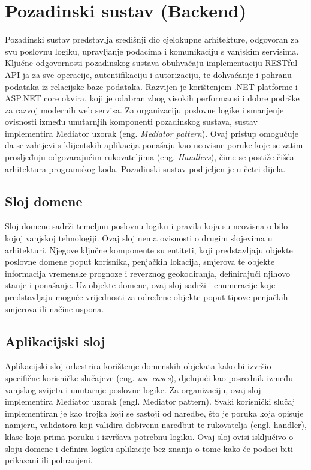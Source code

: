 \section{Pozadinski sustav (Backend)}

Pozadinski sustav predstavlja središnji dio cjelokupne arhitekture, odgovoran za svu poslovnu logiku, upravljanje podacima i komunikaciju s vanjskim servisima. Ključne odgovornosti pozadinskog sustava obuhvaćaju implementaciju RESTful API-ja za sve operacije, autentifikaciju i autorizaciju, te dohvaćanje i pohranu podataka iz relacijske baze podataka. Razvijen je korištenjem .NET platforme i ASP.NET core okvira, koji je odabran zbog visokih performansi i dobre podrške za razvoj modernih web servisa. Za organizaciju poslovne logike i smanjenje ovisnosti između unutarnjih komponenti pozadinskog sustava, sustav implementira Mediator uzorak (eng. \textit{Mediator pattern}). Ovaj pristup omogućuje da se zahtjevi s klijentskih aplikacija ponašaju kao neovisne poruke koje se zatim prosljeđuju odgovarajućim rukovateljima (eng. \textit{Handlers}), čime se postiže čišća arhitektura programskog koda. Pozadinski sustav podijeljen je u četri dijela.

\subsection{Sloj domene}

Sloj domene sadrži temeljnu poslovnu logiku i pravila koja su neovisna o bilo kojoj vanjskoj tehnologiji. Ovaj sloj nema ovisnosti o drugim slojevima u arhitekturi. Njegove ključne komponente su entiteti, koji predstavljaju objekte poslovne domene poput korisnika, penjačkih lokacija, smjerova te objekte informacija vremenske prognoze i reverznog geokodiranja, definirajući njihovo stanje i ponašanje. Uz objekte domene, ovaj sloj sadrži i enumeracije koje predstavljaju moguće vrijednosti za određene objekte poput tipove penjačkih smjerova ili načine uspona.

\subsection{Aplikacijski sloj}

Aplikacijski sloj orkestrira korištenje domenskih objekata kako bi izvršio specifične korisničke slučajeve (eng. \textit {use cases}), djelujući kao posrednik između vanjskog svijeta i unutarnje poslovne logike. Za organizaciju, ovaj sloj implementira Mediator uzorak (engl. Mediator pattern). Svaki korisnički slučaj implementiran je kao trojka koji se sastoji od naredbe, što je poruka koja opisuje namjeru, validatora koji validira dobivenu naredbut te rukovatelja (engl. handler), klase koja prima poruku i izvršava potrebnu logiku. Ovaj sloj ovisi isključivo o sloju domene i definira logiku aplikacije bez znanja o tome kako će podaci biti prikazani ili pohranjeni.


